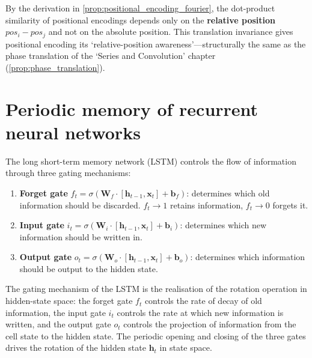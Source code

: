 \begin{remark}\label{rem:positional_encoding_translation_invariance}
By the derivation in \cref{prop:positional_encoding_fourier}, the dot-product similarity of positional encodings depends only on the \textbf{relative position} $pos_i - pos_j$ and not on the absolute position. This translation invariance gives positional encoding its `relative-position awareness'---structurally the same as the phase translation of the `Series and Convolution' chapter (\cref{prop:phase_translation}).
\end{remark}

\section{Periodic memory of recurrent neural networks}

\begin{definition}\label{def:lstm_gates}
The long short-term memory network (LSTM) controls the flow of information through three gating mechanisms:
\begin{enumerate}[label=(\roman*)]
    \item \textbf{Forget gate} $f_t = \sigma(\mathbf{W}_f \cdot [\mathbf{h}_{t-1}, \mathbf{x}_t] + \mathbf{b}_f)$: determines which old information should be discarded. $f_t \to 1$ retains information, $f_t \to 0$ forgets it.
    \item \textbf{Input gate} $i_t = \sigma(\mathbf{W}_i \cdot [\mathbf{h}_{t-1}, \mathbf{x}_t] + \mathbf{b}_i)$: determines which new information should be written in.
    \item \textbf{Output gate} $o_t = \sigma(\mathbf{W}_o \cdot [\mathbf{h}_{t-1}, \mathbf{x}_t] + \mathbf{b}_o)$: determines which information should be output to the hidden state.
\end{enumerate}
The gating mechanism of the LSTM is the realisation of the rotation operation in hidden-state space: the forget gate $f_t$ controls the rate of decay of old information, the input gate $i_t$ controls the rate at which new information is written, and the output gate $o_t$ controls the projection of information from the cell state to the hidden state. The periodic opening and closing of the three gates drives the rotation of the hidden state $\mathbf{h}_t$ in state space.
\end{definition}

